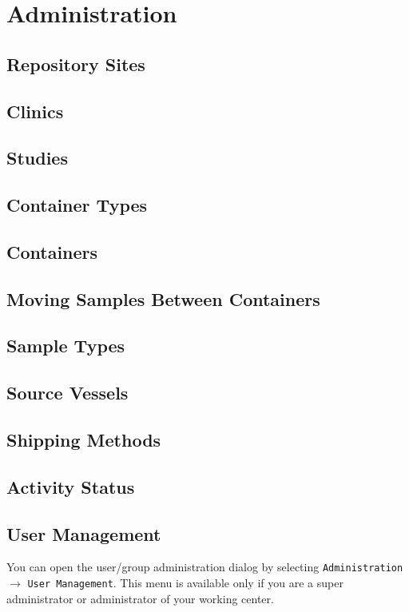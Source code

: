 \chapter{Administration}
\label{chap:administration}

\section{Repository Sites}
\section{Clinics}
\section{Studies}
\section{Container Types}
\section{Containers}
\section{Moving Samples Between Containers}
\section{Sample Types}
\section{Source Vessels}
\section{Shipping Methods}
\section{Activity Status}
\newpage
\section{User Management}

You can open the user/group administration dialog by selecting
\texttt{Administration} $\to$ \texttt{User Management}.
This menu is available only if you are a super administrator or administrator 
of your working center. 

